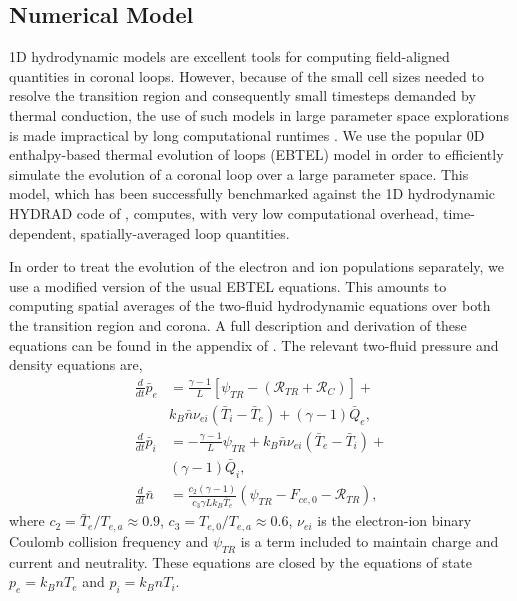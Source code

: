 \documentclass[apj]{emulateapj}
\begin{document}
	\subsection{Numerical Model}
	\label{subsec:numerics}
	\par 1D hydrodynamic models are excellent tools for computing field-aligned quantities in coronal loops. However, because of the small cell sizes needed to resolve the transition region and consequently small timesteps demanded by thermal conduction, the use of such models in large parameter space explorations is made impractical by long computational runtimes \citep{bradshaw_influence_2013}. We use the popular 0D enthalpy-based thermal evolution of loops (EBTEL) model \citep{klimchuk_highly_2008,cargill_enthalpy-based_2012,cargill_enthalpy-based_2012-1,cargill_modelling_2015} in order to efficiently simulate the evolution of a coronal loop over a large parameter space. This model, which has been successfully benchmarked against the 1D hydrodynamic HYDRAD code of \citet{bradshaw_influence_2013}, computes, with very low computational overhead, time-dependent, spatially-averaged loop quantities.
	\par In order to treat the evolution of the electron and ion populations separately, we use a modified version of the usual EBTEL equations. This amounts to computing spatial averages of the two-fluid hydrodynamic equations over both the transition region and corona. A full description and derivation of these equations can be found in the appendix of . The relevant two-fluid pressure and density equations are,
	\begin{align}
		\frac{d}{dt}\bar{p}_e &= \frac{\gamma - 1}{L}\left\lbrack\psi_{TR} - (\mathcal{R}_{TR} + \mathcal{R}_C)\right\rbrack + \\ &k_B\bar{n}\nu_{ei}(\bar{T}_i - \bar{T}_e) + (\gamma - 1)\bar{Q}_e,\label{eq:ebtel2fl_pe}\\
		\frac{d}{dt}\bar{p}_i &= -\frac{\gamma - 1}{L}\psi_{TR} + k_B\bar{n}\nu_{ei}(\bar{T}_e - \bar{T}_i) +\\ &(\gamma - 1)\bar{Q}_i,\label{eq:ebtel2fl_pi}\\
		\frac{d}{dt}\bar{n} &= \frac{c_2(\gamma - 1)}{c_3\gamma Lk_B\bar{T}_e}\left(\psi_{TR} - F_{ce,0} - \mathcal{R}_{TR}\right),\label{eq:ebtel2fl_n}
	\end{align}
	where $c_2=\bar{T}_e/T_{e,a}\approx0.9$, $c_3=T_{e,0}/T_{e,a}\approx0.6$, $\nu_{ei}$ is the electron-ion binary Coulomb collision frequency and $\psi_{TR}$ is a term included to maintain charge and current and neutrality. These equations are closed by the equations of state $p_e=k_BnT_e$ and $p_i=k_BnT_i$.
\end{document}
